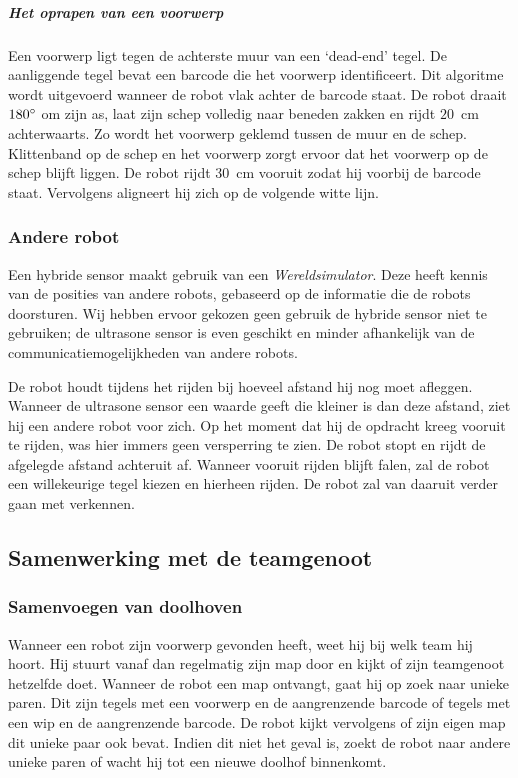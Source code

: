\documentclass[eind]{penoverslag}
\begin{document}
\subparagraph{Het oprapen van een voorwerp}
Een voorwerp ligt tegen de achterste muur van een `dead-end' tegel. De aanliggende tegel bevat een barcode die het voorwerp identificeert. Dit algoritme wordt uitgevoerd wanneer de robot vlak achter de barcode staat. De robot draait $180\degree$ om zijn as, laat zijn schep volledig naar beneden zakken en rijdt $20$~cm achterwaarts. Zo wordt het voorwerp geklemd tussen de muur en de schep. Klittenband op de schep en het voorwerp zorgt ervoor dat het voorwerp op de schep blijft liggen. De robot rijdt $30$~cm vooruit zodat hij voorbij de barcode staat. Vervolgens aligneert hij zich op de volgende witte lijn.

\subsubsection{Andere robot}
\label{sssec:AlgoCollision}
Een hybride sensor maakt gebruik van een \textit{Wereldsimulator}.
Deze heeft kennis van de posities van andere robots,
gebaseerd op de informatie die de robots doorsturen.
Wij hebben ervoor gekozen geen gebruik de hybride sensor niet te gebruiken; de ultrasone sensor is even geschikt en minder afhankelijk van de communicatiemogelijkheden van andere robots.

De robot houdt tijdens het rijden bij hoeveel afstand hij nog moet afleggen. Wanneer de ultrasone sensor een waarde geeft die kleiner is dan deze afstand, ziet hij een andere robot voor zich. Op het moment dat hij de opdracht kreeg vooruit te rijden, was hier immers geen versperring te zien. De robot stopt en rijdt de afgelegde afstand achteruit af. Wanneer vooruit rijden blijft falen, zal de robot een willekeurige tegel kiezen en hierheen rijden. De robot zal van daaruit verder gaan met verkennen.

\subsection{Samenwerking met de teamgenoot}
\label{ssec:AlgoSamen}

\subsubsection{Samenvoegen van doolhoven}
\label{sssec:AlgoMappen}
Wanneer een robot zijn voorwerp gevonden heeft, weet hij bij welk team hij hoort. Hij stuurt vanaf dan regelmatig zijn map door en kijkt of zijn teamgenoot hetzelfde doet.
Wanneer de robot een map ontvangt, gaat hij op zoek naar unieke paren. Dit zijn tegels met een voorwerp en de aangrenzende barcode of tegels met een wip en de aangrenzende barcode. De robot kijkt vervolgens of zijn eigen map dit unieke paar ook bevat. Indien dit niet het geval is, zoekt de robot naar andere unieke paren of wacht hij tot een nieuwe doolhof binnenkomt.
\end{document}
